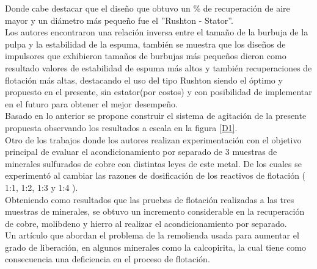\documentclass[11pt,letter
								]
								{article}
\begin{document}
Donde cabe destacar que el diseño que obtuvo un \% de recuperación de aire mayor y un diámetro más pequeño fue el ''Rushton - Stator''.\\


Los autores  encontraron una relación inversa entre el tamaño de la burbuja de la pulpa y la estabilidad de la espuma, también se muestra que los diseños de impulsores que exhibieron tamaños de burbujas más pequeños dieron como resultado valores de estabilidad de espuma más altos y también recuperaciones de flotación más altas, destacando el uso del tipo Rushton  siendo el óptimo  y propuesto en el presente, sin estator(por costos) y con posibilidad de implementar en el futuro para obtener el mejor desempeño. \\

Basado en lo anterior se propone construir  el sistema de agitación de la presente propuesta observando los resultados a escala en la figura \ref{D1}.\\




Otro de los trabajos donde  los autores realizan experimentación con el objetivo principal de evaluar el acondicionamiento por separado de 3 muestras de minerales sulfurados de cobre con distintas leyes de este metal. De los cuales se experimentó al cambiar las razones de dosificación de los reactivos de flotación ( 1:1, 1:2, 1:3 y 1:4 ).\\
Obteniendo como resultados que las pruebas de flotación realizadas a las tres muestras de minerales, se obtuvo un incremento considerable en la recuperación de cobre, molibdeno y hierro al realizar el acondicionamiento por separado. \cite{Art3}\\




Un artículo que abordan el problema de la remolienda usada para aumentar el grado de liberación,  en algunos minerales como la calcopirita, la cual tiene como consecuencia  una deficiencia en el proceso de flotación.\\
\end{document}
